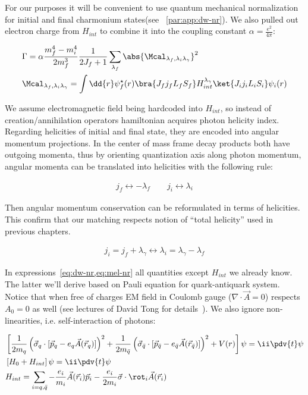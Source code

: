 For our purposes it will be convenient to use quantum mechanical normalization for initial and final charmonium states(see ~\cref{par:app:dw-nr}). We also pulled out electron charge from $H_{int}$ to combine it into the coupling constant $\alpha = \frac{e^2}{4 \pi}$: 

\begin{align}
    &\Gamma = \alpha \frac{m_f^4 - m_i^4}{2 m_f^3} \frac{1}{2J_f + 1} \sum_{\lambda_f} \abs{\Mcal_{\lambda_f, \lambda_i \lambda_\gamma}}^2 \label{eq:dw-nr} \\
    &\Mcal_{\lambda_f, \lambda_i \lambda_\gamma} = \int \dd{r} \psi_f^\star(r) \bra{J_f j_f L_f S_f} H_{int}^{\lambda_\gamma} \ket{J_i j_i L_i S_i} \psi_i(r) \label{eq:mel-nr}
\end{align}

We assume electromagnetic field being hardcoded into $H_{int}$, so instead of creation/annihilation operators hamiltonian acquires photon helicity index. Regarding helicities of initial and final state, they are encoded into angular momentum projections. In the center of mass frame decay products both have outgoing momenta, thus by orienting quantization axis along photon momentum, angular momenta can be translated into helicities with the following rule:

\begin{align}
    j_f \leftrightarrow -\lambda_f \qquad j_i \leftrightarrow \lambda_i
\end{align}

Then angular momentum conservation can be reformulated in terms of helicities. This confirm that our matching respects notion of ``total helicity'' used in previous chapters.

\begin{align}
    j_i = j_f + \lambda_\gamma \leftrightarrow \lambda_i = \lambda_\gamma - \lambda_f
\end{align}

In expressions~\cref{eq:dw-nr,eq:mel-nr} all quantities except $H_{int}$ we already know. The latter we'll derive based on Pauli equation for quark-antiquark system. Notice that when free of charges EM field in Coulomb gauge ($\nabla\cdot\vec{A} = 0$) respects $A_0 = 0$ as well (see lectures of David Tong for details~\cite{tong-qed}). We also ignore non-linearities, i.e. self-interaction of photons:

\begin{align}
    &\left[\frac{1}{2m_q} \left( \vec{\sigma}_q \cdot [\vec{p}_q - e_q \vec{A}(\vec{r}_q)] \right)^2 + \frac{1}{2m_{\bar{q}}} \left( \vec{\sigma}_{\bar{q}} \cdot [\vec{p}_{\bar{q}} - e_{\bar{q}} \vec{A}(\vec{r}_{\bar{q}})] \right)^2 + V(r) \right] \psi = \ii \pdv{t} \psi \\
    &\left[H_0 + H_{int} \right] \psi= \ii \pdv{t} \psi \\
    &H_{int} = \sum_{i = q, \bar{q}} -\frac{e_i}{m_i} \vec{A}(\vec{r}_i) \vec{p}_i - \frac{e_i}{2 m_i} \vec{\sigma} \cdot \rot_i \vec{A}(\vec{r}_i)
\end{align}

